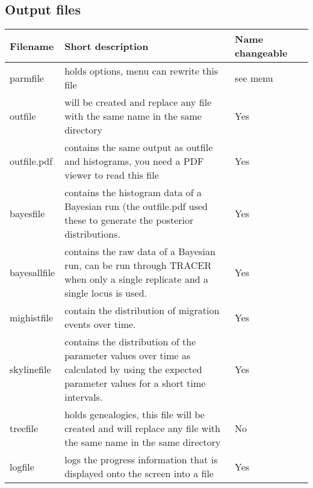 \begin{description}
\section{Output files}
\begin{center}
\begin{tabular}{l p{8.0cm} l c}
\hline
Filename & Short description & Name changeable\\
\hline
parmfile     & {holds options, menu can rewrite this file}  & see menu\\
outfile           & {will be created and replace any file with the same name in the same directory}  & Yes\\
outfile.pdf          & contains the same output as outfile and histograms, you need a PDF viewer to read this file  & Yes\\
bayesfile & contains the histogram data of a Bayesian run (the outfile.pdf used these to generate the posterior distributions. & Yes\\
bayesallfile & contains the raw data of a Bayesian run, can be run through TRACER when only a single replicate and a single locus is used. & Yes\\
mighistfile &  contain the distribution of migration events over time. & Yes\\
skylinefile &  contains the distribution of the parameter values over time as calculated by using the expected parameter values for a short time intervals. & Yes\\
treefile         & {holds genealogies, this file will be created and will replace any file with the same name in the same directory} & No\\
logfile  &  {logs the progress information that is displayed onto the screen into a file} & Yes\\
\hline
\end{tabular}
\end{center}

\end{description}
